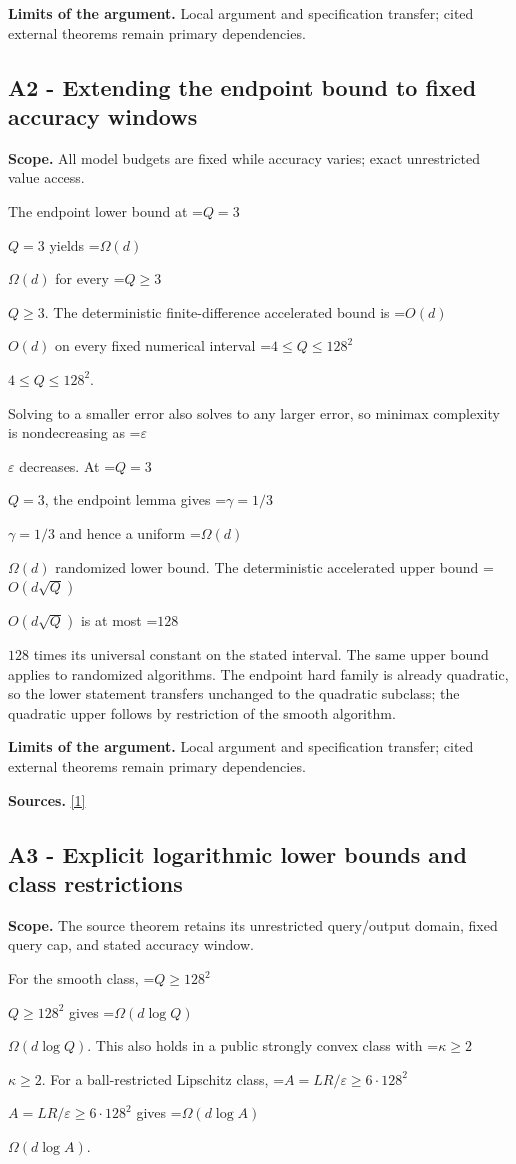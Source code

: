 \documentclass[10pt,a4paper]{article}
\newcommand{\AtlasMath}[1]{\par\begingroup\centering\setbox0=\hbox{$\displaystyle #1$}\ifdim\wd0>1.4\linewidth\typeout{ATLAS WIDE FORMULA: \the\wd0}\fi\ifdim\wd0>\linewidth\resizebox{\linewidth}{!}{\box0}\else\box0\fi\par\endgroup}
\newcommand{\AtlasInlineMath}[1]{\begingroup\setbox0=\hbox{$#1$}\ifdim\wd0>.4\linewidth\endgroup\AtlasMath{#1}\else\endgroup$#1$\fi}
\begin{document}
\textbf{Limits of the argument.} Local argument and specification transfer; cited external theorems remain primary dependencies.

\subsection{A2 - Extending the endpoint bound to fixed accuracy windows}
\textbf{Scope.} All model budgets are fixed while accuracy varies; exact unrestricted value access.

The endpoint lower bound at \AtlasInlineMath{Q=3} yields \AtlasInlineMath{\Omega(d)} for every \AtlasInlineMath{Q\ge3}. The deterministic finite-difference accelerated bound is \AtlasInlineMath{O(d)} on every fixed numerical interval \AtlasInlineMath{4\le Q\le128^2}.

Solving to a smaller error also solves to any larger error, so minimax complexity is nondecreasing as \AtlasInlineMath{\varepsilon} decreases. At \AtlasInlineMath{Q=3}, the endpoint lemma gives \AtlasInlineMath{\gamma=1/3} and hence a uniform \AtlasInlineMath{\Omega(d)} randomized lower bound. The deterministic accelerated upper bound \AtlasInlineMath{O(d\sqrt Q)} is at most \AtlasInlineMath{128} times its universal constant on the stated interval. The same upper bound applies to randomized algorithms. The endpoint hard family is already quadratic, so the lower statement transfers unchanged to the quadratic subclass; the quadratic upper follows by restriction of the smooth algorithm.

\textbf{Limits of the argument.} Local argument and specification transfer; cited external theorems remain primary dependencies.

\textbf{Sources.} \href{https://arxiv.org/html/2610.00345v1}{[1]}

\subsection{A3 - Explicit logarithmic lower bounds and class restrictions}
\textbf{Scope.} The source theorem retains its unrestricted query/output domain, fixed query cap, and stated accuracy window.

For the smooth class, \AtlasInlineMath{Q\ge128^2} gives \AtlasInlineMath{\Omega(d\log Q)}. This also holds in a public strongly convex class with \AtlasInlineMath{\kappa\ge2}. For a ball-restricted Lipschitz class, \AtlasInlineMath{A=LR/\varepsilon\ge6\cdot128^2} gives \AtlasInlineMath{\Omega(d\log A)}.
\end{document}
